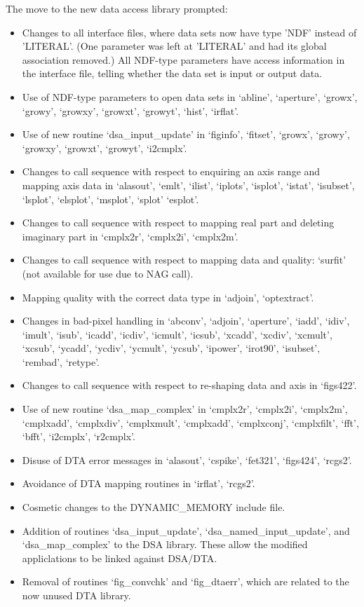    The move to the new data access library prompted:

\begin{itemize}
\item Changes to all interface files, where data sets now have type 'NDF'
      instead of 'LITERAL'.  (One parameter was left at 'LITERAL' and had
      its global association removed.) All NDF-type parameters have access
      information in the interface file, telling whether the data set is
      input or output data.
\item Use of NDF-type parameters to open data sets in `abline', `aperture',
      `growx', `growy', `growxy', `growxt', `growyt', `hist', `irflat'.
\item Use of new routine `dsa\_input\_update' in `figinfo', `fitset',
      `growx', `growy', `growxy', `growxt', `growyt', `i2cmplx'.
\item Changes to call sequence with respect to enquiring an axis range and
      mapping axis data in `alasout', `emlt', `ilist', `iplots',
      `isplot', `istat', `isubset', `lsplot', `elsplot', `msplot',
      `splot' `esplot'.
\item Changes to call sequence with respect to mapping real part and
      deleting imaginary part in `cmplx2r', `cmplx2i', `cmplx2m'.
\item Changes to call sequence with respect to mapping data and quality:
      `surfit' (not available for use due to NAG call).
\item Mapping quality with the correct data type in `adjoin', `optextract'.
\item Changes in bad-pixel handling in `abconv', `adjoin', `aperture',
      `iadd', `idiv', `imult', `isub', `icadd', `icdiv', `icmult',
      `icsub', `xcadd', `xcdiv', `xcmult', `xcsub', `ycadd', `ycdiv',
      `ycmult', `ycsub', `ipower', `irot90', `isubset', `rembad', `retype'.
\item Changes to call sequence with respect to re-shaping data and axis in
      `figs422'.
\item Use of new routine `dsa\_map\_complex' in `cmplx2r', `cmplx2i',
      `cmplx2m', `cmplxadd', `cmplxdiv', `cmplxmult', `cmplxadd',
      `cmplxconj', `cmplxfilt', `fft', `bfft', `i2cmplx', `r2\-cmplx'.
\item Disuse of DTA error messages in `alasout', `cspike', `fet321', `figs424',
      `rcgs2'.
\item Avoidance of DTA mapping routines in `irflat', `rcgs2'.
\item Cosmetic changes to the DYNAMIC\_MEMORY include file.
\item Addition of routines `dsa\_input\_update',
      `dsa\_named\_input\_update', and `dsa\_map\_com\-plex' to the DSA
      library.  These allow the modified appliclations to be linked
      against DSA/DTA.
\item Removal of routines `fig\_convchk' and `fig\_dtaerr', which are
      related to the now unused DTA library.
\end{itemize}


